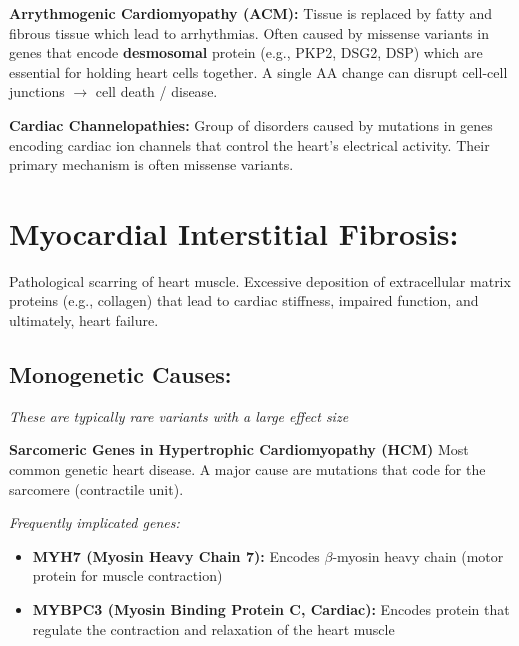 \documentclass[../main.tex]{subfiles}
\begin{document}
\vspace{0.3cm}

\textbf{Arrythmogenic Cardiomyopathy (ACM):} Tissue is replaced by fatty and fibrous tissue which lead to arrhythmias. Often caused by missense variants in genes that encode \textbf{desmosomal} protein (e.g., PKP2, DSG2, DSP) which are essential for holding heart cells together. A single AA change can disrupt cell-cell junctions $\rightarrow$ cell death / disease.

\vspace{0.3cm}

\textbf{Cardiac Channelopathies:} Group of disorders caused by mutations in genes encoding cardiac ion channels that control the heart's electrical activity. Their primary mechanism is often missense variants. 

\hrulefill

 \cite{Nauffal2023}

\hrulefill

\section{Myocardial Interstitial Fibrosis:}
Pathological scarring of heart muscle. Excessive deposition of extracellular matrix proteins (e.g., collagen) that lead to cardiac stiffness, impaired function, and ultimately, heart failure.

\subsection{Monogenetic Causes:}
\textit{These are typically rare variants with a large effect size}

\vspace{0.2cm}

\textbf{Sarcomeric Genes in Hypertrophic Cardiomyopathy (HCM)} Most common genetic heart disease. A major cause are mutations that code for the sarcomere (contractile unit).

\vspace{0.2cm}

\textit{Frequently implicated genes:}

\begin{itemize}
    \item \textbf{MYH7 (Myosin Heavy Chain 7):} Encodes $\beta$-myosin heavy chain (motor protein for muscle contraction)
    \item \textbf{MYBPC3 (Myosin Binding Protein C, Cardiac):} Encodes protein that regulate the contraction and relaxation of the heart muscle
\end{itemize}
\end{document}
